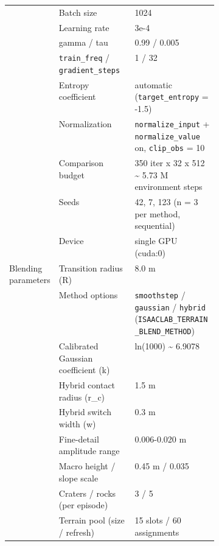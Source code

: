 \begin{table}[htb]
\begin{tabular}{@{}llp{0.40\linewidth}@{}}
 & Batch size & 1024 \\
 & Learning rate & 3e-4 \\
 & gamma / tau & 0.99 / 0.005 \\
 & \texttt{train\_freq} / \texttt{gradient\_steps} & 1 / 32 \\
 & Entropy coefficient & automatic (\texttt{target\_entropy} = -1.5) \\
 & Normalization & \texttt{normalize\_input} + \texttt{normalize\_value} on, \texttt{clip\_obs} = 10 \\
 & Comparison budget & 350 iter x 32 x 512 \textasciitilde{} 5.73 M environment steps \\
 & Seeds & 42, 7, 123 (n = 3 per method, sequential) \\
 & Device & single GPU (cuda:0) \\
Blending parameters & Transition radius (R) & 8.0 m \\
 & Method options & \texttt{smoothstep} / \texttt{gaussian} / \texttt{hybrid} (\texttt{ISAACLAB\_TERRAIN\_BLEND\_METHOD}) \\
 & Calibrated Gaussian coefficient (k) & ln(1000) \textasciitilde{} 6.9078 \\
 & Hybrid contact radius (r\_c) & 1.5 m \\
 & Hybrid switch width (w) & 0.3 m \\
 & Fine-detail amplitude range & 0.006-0.020 m \\
 & Macro height / slope scale & 0.45 m / 0.035 \\
 & Craters / rocks (per episode) & 3 / 5 \\
 & Terrain pool (size / refresh) & 15 slots / 60 assignments \\
\bottomrule
\end{tabular}
\end{table}
